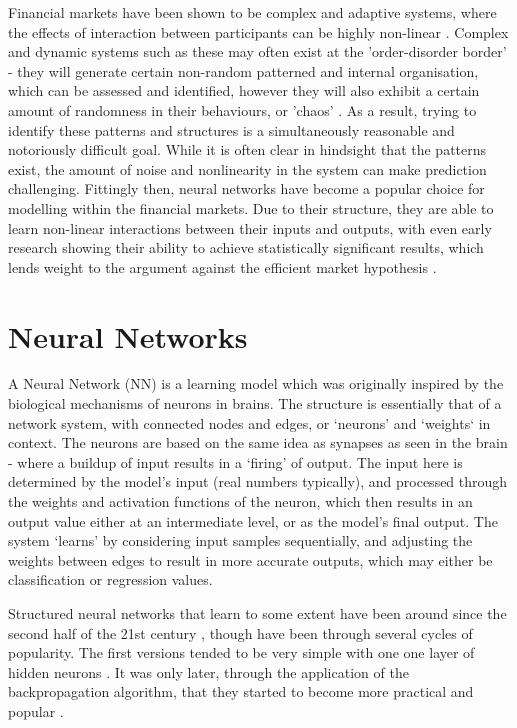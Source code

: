 \documentclass[a4paper,latin]{paper}
\begin{document}
Financial markets have been shown to be complex and adaptive systems, where the effects of interaction 
between participants can be highly non-linear \cite {Arthur}. Complex and dynamic systems such as these may 
often exist at the 'order-disorder border' - they will generate certain non-random patterned and internal organisation, 
which can be assessed and identified, however they will also exhibit a certain amount of randomness in their behaviours, 
or 'chaos' \cite {Crutchfield}. As a result, trying to identify these patterns and structures is a simultaneously 
reasonable and notoriously difficult goal. While it is often clear in hindsight that the patterns exist, the amount of 
noise and nonlinearity in the system can make prediction challenging.
Fittingly then, neural networks have become a popular choice for modelling within the financial markets. Due to 
their structure, they are able to learn non-linear interactions between their inputs and outputs, with even early research 
showing their ability to achieve statistically significant results, which lends weight to the 
argument against the efficient market hypothesis \cite {Skabar}. 
\hfill \break

\section{Neural Networks}

A Neural Network (NN) is a learning model which was originally inspired by the biological mechanisms of neurons 
in brains. The structure is essentially that of a network system, with connected nodes and edges, or ‘neurons’ and 
‘weights‘ in context. The neurons are based on the same idea as synapses as seen in the brain - where a buildup 
of input results in a ‘firing’ of output. The input here is determined by the model’s input (real numbers typically), 
and processed through the weights and activation functions of the neuron, which then results in an output value 
either at an intermediate level, or as the model’s final output. The system ‘learns’ by considering input samples 
sequentially, and adjusting the weights between edges to result in more accurate outputs, which may either be 
classification or regression values. 
\hfill \break 

Structured neural networks that learn to some extent have been around since the second half of the 21st 
century \cite{Schmidhuber}, though have been through several cycles of popularity. The first versions tended to be very simple 
with one one layer of hidden neurons \cite{Ivakhnenko}. It was only later, through the application of 
the backpropagation algorithm, that they started to become more practical and popular \cite{Werbos}.
\hfill \break 
\end{document}
